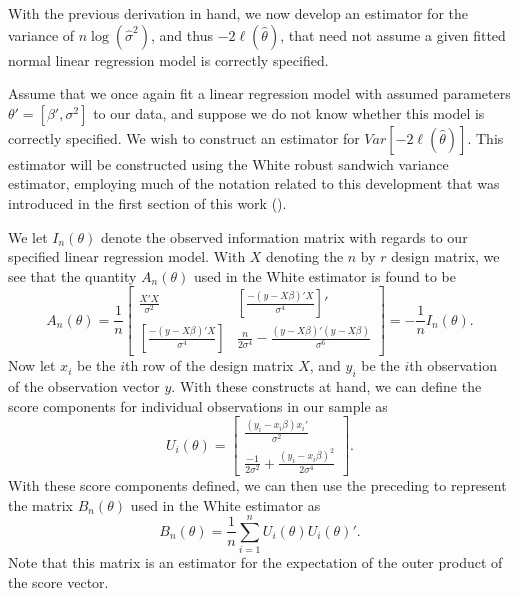 \documentclass[12pt]{article} %
\theoremstyle{definition}
\begin{document}
		With the previous derivation in hand, we now develop an estimator for the variance of $n\log(\hat{\sigma}^2)$, and thus $-2 \ell (\hat{\theta})$,
		that need not assume a given fitted normal linear regression model is correctly specified.

		Assume that we once again fit a linear regression model with assumed parameters $\theta' = [\beta', \sigma^2]$ to our data, and suppose we do not know whether this model is correctly specified.
		We wish to construct an estimator for $Var \left[ -2 \ell (\hat{\theta}  ) \right]$. This estimator will be constructed using the White robust sandwich variance estimator, employing
		much of the notation related to this development that was introduced in the first section of this work (\cite{White1980}).

		We let $I_{n} (\theta)$ denote the observed information matrix with regards to our specified linear regression model. With $X$ denoting the $n$ by $r$ design matrix, we see that
		the quantity $A_n (\theta)$ used in the White estimator is found to be 
		\begin{equation*}
			A_n(\theta) = \frac{1}{n}
			\begin{bmatrix}
				\frac{X'X}{\sigma^2} & \left[ \frac{-(y-X\beta)'X}{\sigma^4} \right]' \\
				\left[ \frac{-(y-X\beta)'X}{\sigma^4} \right] &  \frac{n}{2 \sigma^4} - \frac{(y-X\beta)'(y-X\beta)}{\sigma^6}
				\end{bmatrix}
				= -\frac{1}{n} I_n(\theta) .
		\end{equation*}
		Now let $x_i$ be the $i$th row of the design matrix $X$, and $y_i$ be the $i$th observation of the observation vector $y$. With these constructs at hand, we can define the score components
		for individual observations in our sample as
		\begin{equation*}
			U_i(\theta) = 
			\begin{bmatrix}
				\frac{(y_i-x_i \beta)x_i'}{\sigma^2} \\
				\frac{-1}{2 \sigma^2} + \frac{(y_i - x_i \beta)^2}{2 \sigma^4}
			\end{bmatrix}
			.
		\end{equation*}
		With these score components defined, we can then use the preceding to represent the matrix $B_n (\theta)$ used in the White estimator as
		\begin{equation*}
			B_n(\theta) = \frac{1}{n} \sum_{i=1}^{n} U_i(\theta) U_i(\theta)' .
		\end{equation*}
		Note that this matrix is an estimator for the expectation of the outer product of the score vector.
\end{document}

